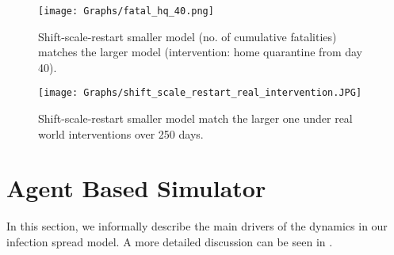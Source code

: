 \documentclass{article}
\theoremstyle{definition}
\begin{document}
  
  \begin{figure}
    \centering
    \texttt{[image: Graphs/fatal\_hq\_40.png]}
  \caption{Shift-scale-restart smaller model (no. of cumulative fatalities) matches the larger model (intervention: home quarantine from day 40). }
\label{fatal_hq_40}
  \end{figure}


\begin{figure}
      \centering
      
 \texttt{[image: Graphs/shift\_scale\_restart\_real\_intervention.JPG]}   
   \caption{Shift-scale-restart smaller model match the larger one under real world interventions over 250 days. }
    \label{shift_scale_restart_real_intervention}
  \end{figure}

      

\section{Agent Based Simulator} 

\label{ABS_brief}
In this section, we informally describe the main drivers of  the dynamics in our infection spread model. A more detailed discussion can be seen in \cite{City_Simulator_IISc_TIFR_2020}. 
\end{document}
